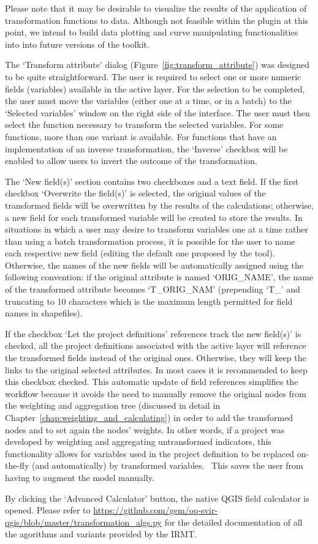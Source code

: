 Please note that it may be desirable to visualize the results of the
application of transformation functions to data. Although not feasible within
the plugin at this point, we intend to build data plotting and curve
manipulating functionalities into into future versions of the toolkit.   

The `Transform attribute' dialog (Figure~\ref{fig:transform_attribute}) was
designed to be quite straightforward. The user is required to select one or
more numeric fields (variables) available in the active layer. For the
selection to be completed, the user must move the variables (either one at a
time, or in a batch) to the `Selected variables' window on the right side of
the interface. The user must then select the function necessary to transform
the selected variables. For some functions, more than one variant is available.
For functions that have an implementation of an inverse transformation, the
`Inverse' checkbox will be enabled to allow users to invert the outcome of the
transformation.

The `New field(s)' section contains two checkboxes and a text field. If the
first checkbox `Overwrite the field(s)' is selected, the original values of the
transformed fields will be overwritten by the results of the calculations;
otherwise, a new field for each transformed variable will be created to store
the results. In situations in which a user may desire to transform variables
one at a time rather than using a batch transformation process, it is possible
for the user to name each respective new field (editing the default one
proposed by the tool). Otherwise, the names of the new fields will be
automatically assigned using the following convention: if the original
attribute is named `ORIG\_NAME', the name of the transformed attribute becomes
`T\_ORIG\_NAM' (prepending `T\_' and truncating to 10 characters which is the
maximum length permitted for field names in shapefiles).

If the checkbox `Let the project definitions' references track the new
field(s)' is checked, all the project definitions associated with the active
layer will reference the transformed fields instead of the original ones.
Otherwise, they will keep the links to the original selected attributes. In
most cases it is recommended to keep this checkbox checked. This automatic
update of field references simplifies the workflow because it avoids the need
to manually remove the original nodes from the weighting and aggregation tree
(discussed in detail in Chapter~\ref{chap:weighting_and_calculating}) in
order to add the transformed nodes and to set again the nodes' weights. In
other words, if a project was developed by weighting and aggregating
untransformed indicators, this functionality allows for variables used in the
project definition to be replaced on-the-fly (and automatically) by transformed
variables.  This saves the user from having to augment the model manually.  

By clicking the `Advanced Calculator' button, the native QGIS field calculator
is opened.  Please refer to
\url{https://github.com/gem/oq-svir-qgis/blob/master/transformation_algs.py}
for the detailed documentation of all the agorithms and variants provided by
the IRMT.

